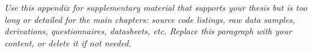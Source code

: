 \vspace{1cm}
\textit{Use this appendix for supplementary material that supports your thesis but is too long or detailed for the main chapters: source code listings, raw data samples, derivations, questionnaires, datasheets, etc. Replace this paragraph with your content, or delete it if not needed.}

